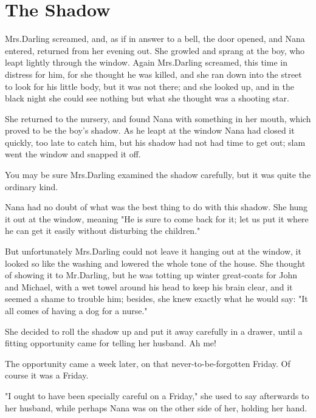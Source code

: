 
\chapter{The Shadow}

Mrs.\@ Darling screamed,
and, as if in answer to a bell, the door opened,
and Nana entered, returned from her evening out.
She growled and sprang at the boy, who leapt lightly through the window.
Again Mrs.\@ Darling screamed, this time in distress for him, for she thought he was killed,
and she ran down into the street to look for his little body, but it was not there;
and she looked up, and in the black night she could see nothing but what she thought was a shooting star.

She returned to the nursery,
and found Nana with something in her mouth, which proved to be the boy's shadow.
As he leapt at the window Nana had closed it quickly, too late to catch him,
but his shadow had not had time to get out;
slam went the window and snapped it off.

You may be sure Mrs.\@ Darling examined the shadow carefully,
but it was quite the ordinary kind.

Nana had no doubt of what was the best thing to do with this shadow.
She hung it out at the window, meaning "He is sure to come back for it;
let us put it where he can get it easily without disturbing the children."

But unfortunately Mrs.\@ Darling could not leave it hanging out at the window,
it looked so like the washing and lowered the whole tone of the house.
She thought of showing it to Mr.\@ Darling,
but he was totting up winter great-coats for John and Michael,
with a wet towel around his head to keep his brain clear, and it seemed a shame to trouble him;
besides, she knew exactly what he would say:
"It all comes of having a dog for a nurse."

She decided to roll the shadow up and put it away carefully in a drawer,
until a fitting opportunity came for telling her husband.
Ah me!

The opportunity came a week later, on that never-to-be-forgotten Friday.
Of course it was a Friday.

"I ought to have been specially careful on a Friday," she used to say afterwards to her husband,
while perhaps Nana was on the other side of her, holding her hand.

